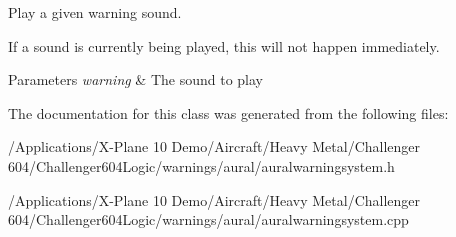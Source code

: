 Play a given warning sound. 

If a sound is currently being played, this will not happen immediately.


\begin{DoxyParams}{Parameters}
{\em warning} & The sound to play \\
\hline
\end{DoxyParams}


The documentation for this class was generated from the following files\-:\begin{DoxyCompactItemize}
\item 
/\-Applications/\-X-\/\-Plane 10 Demo/\-Aircraft/\-Heavy Metal/\-Challenger 604/\-Challenger604\-Logic/warnings/aural/auralwarningsystem.\-h\item 
/\-Applications/\-X-\/\-Plane 10 Demo/\-Aircraft/\-Heavy Metal/\-Challenger 604/\-Challenger604\-Logic/warnings/aural/auralwarningsystem.\-cpp\end{DoxyCompactItemize}
